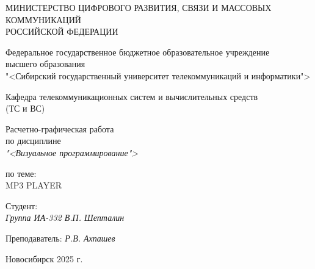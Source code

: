 \thispagestyle{empty}

\begin{center}
    МИНИСТЕРСТВО ЦИФРОВОГО РАЗВИТИЯ, СВЯЗИ И МАССОВЫХ КОММУНИКАЦИЙ \\ РОССИЙСКОЙ ФЕДЕРАЦИИ

    \vspace{20pt}

    Федеральное государственное бюджетное образовательное учреждение  \\  высшего образования \\
    "<Сибирский государственный университет телекоммуникаций и информатики"> \\

    \vspace{20pt}

    Кафедра телекоммуникационных систем и вычислительных средств \\  (ТС и ВС)
\end{center}

\vfill

\begin{center}
    Расчетно-графическая работа \\  
    по дисциплине \\
    \textit{"<Визуальное программирование">}

    \vspace{20pt}

    по теме: \\
    \uppercase{MP3 Player}
\end{center}

\vfill

    \noindent Студент: \\
    \textit{Группа ИА-332 \hfill В.П. Шепталин}

    \vspace{20pt}

    \noindent Преподаватель: \hfill \textit{Р.В. Ахпашев}


\vfill

\begin{center}
    Новосибирск 2025 г.
\end{center}